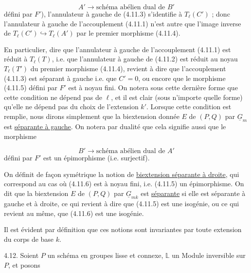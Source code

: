 \begin{equation}\tag{4.11.5}
A' \longrightarrow \text{schéma abélien dual de } B'
\end{equation}
défini par $F'$), l'annulateur à gauche de (4.11.3) s'identifie à $T_{\ell}(C')$ ; donc l'annulateur à gauche de l'accouplement (4.11.1) n'est autre que l'image inverse de $T_{\ell}(C') \hookrightarrow T_{\ell}(A')$ par le premier morphisme (4.11.4).

En particulier, dire que l'annulateur à gauche de l'accouplement (4.11.1) est réduit à $T_{\ell}(T)$, i.e. que l'annulateur à gauche de (4.11.2) est réduit au noyau $T_{\ell}(T')$ du premier morphisme (4.11.4), revient à dire que l'accouplement (4.11.3) est séparant à gauche i.e. que $C' = 0$, ou encore que le morphisme (4.11.5) défini par $F'$ est à noyau fini. On notera sous cette dernière forme que cette condition ne dépend pas de $\ell$, et il est clair (sous n'importe quelle forme) qu'elle ne dépend pas du choix de l'extension $k'$. Lorsque cette condition est remplie, nous dirons simplement que la biextension donnée $E$ de $(P,Q)$ par $\underline{G}_m$ est \underline{séparante à gauche}. On notera par dualité que cela signifie aussi que le morphisme

\begin{equation}\tag{4.11.6}
B' \longrightarrow \text{schéma abélien dual de } A'
\end{equation}
défini par $F'$ est un épimorphisme (i.e. surjectif).



On définit de façon symétrique la notion de \underline{biextension séparante à droite}, qui correspond au cas où (4.11.6) est à noyau fini, i.e. (4.11.5) un épimorphisme. On dit que la biextension $E$ de $(P,Q)$ par $\underline{G}_{mk}$ est \underline{séparante} si elle est séparante à gauche et à droite, ce qui revient à dire que (4.11.5) est une isogénie, ou ce qui revient au même, que (4.11.6) est une isogénie.

Il est évident par définition que ces notions sont invariantes par toute extension du corps de base $k$.

4.12. Soient $P$ un schéma en groupes lisse et connexe, $\mathbb{L}$ un Module inversible sur $P$, et posons

